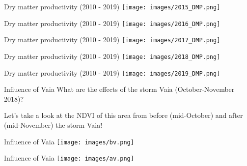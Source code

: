 \documentclass[pdf]{beamer}
\begin{document}
    \begin{frame}{Dry matter productivity (2010 - 2019)}
	\texttt{[image: images/2015\_DMP.png]}
    \end{frame}

    \begin{frame}{Dry matter productivity (2010 - 2019)}
	\texttt{[image: images/2016\_DMP.png]}
    \end{frame}

    \begin{frame}{Dry matter productivity (2010 - 2019)}
	\texttt{[image: images/2017\_DMP.png]}
    \end{frame}

    \begin{frame}{Dry matter productivity (2010 - 2019)}
	\texttt{[image: images/2018\_DMP.png]}
    \end{frame}

    \begin{frame}{Dry matter productivity (2010 - 2019)}
	\texttt{[image: images/2019\_DMP.png]}
    \end{frame}

    \begin{frame}{Influence of Vaia}
        What are the effects of the storm Vaia (October-November 2018)?

        \pause

        Let's take a look at the NDVI of this area from before (mid-October) and after (mid-November) the storm Vaia!
    \end{frame}

    \begin{frame}{Influence of Vaia}
       \texttt{[image: images/bv.png]} 
    \end{frame}

    \begin{frame}{Influence of Vaia}
       \texttt{[image: images/av.png]} 
    \end{frame}
\end{document}
